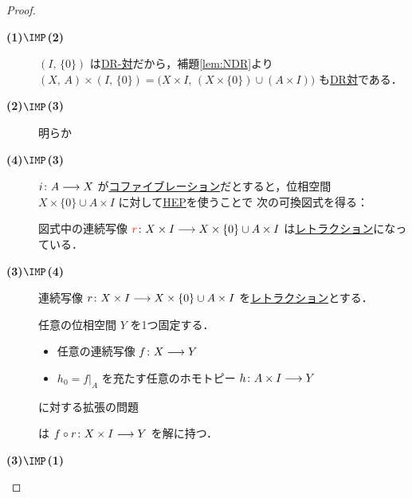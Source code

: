 \documentclass[algtopo_main]{subfiles}
\begin{document}
\begin{proof}
    \begin{description}
        \item[\textbf{(1)$\IMP$(2)}] $(I,\, \{0\})$ は\hyperref[def:NDR]{DR-対}だから，補題\ref{lem:NDR}より $(X,\, A) \times (I,\, \{0\}) = \bigl( X \times I,\, (X \times \{0\}) \cup (A \times I) \bigr)$ も\hyperref[def:NDR]{DR対}である．
        \item[\textbf{(2)$\IMP$(3)}] 明らか
        \item[\textbf{(4)$\IMP$(3)}] 
        $i \colon A \longrightarrow X$ が\hyperref[def:cofibration]{コファイブレーション}だとすると，位相空間 $X \times \{0\} \cup A \times I$ に対して\hyperref[def:HEP]{HEP}を使うことで
        次の可換図式を得る：
        \begin{center}
        \end{center}
        図式中の連続写像 $\textcolor{red}{r} \colon X \times I \longrightarrow X \times \{0\} \cup A \times I$ は\hyperref[def:retract]{レトラクション}になっている．
        \item[\textbf{(3)$\IMP$(4)}] 
        連続写像 $r \colon X \times I \longrightarrow X \times \{0\} \cup A \times I$ を\hyperref[def:retract]{レトラクション}とする．

        任意の位相空間 $Y$ を1つ固定する．
        \begin{itemize}
            \item 任意の連続写像 $f \colon X \longrightarrow Y$
            \item $h_0 = f|_A$ を充たす任意のホモトピー $h \colon A \times I \longrightarrow Y$
        \end{itemize}
        に対する拡張の問題
        \begin{center}
        \end{center}
        は $f \circ r \colon X \times I \longrightarrow Y$ を解に持つ．
        \item[\textbf{(3)$\IMP$(1)}] 
    \end{description}
    
\end{proof}
\end{document}
